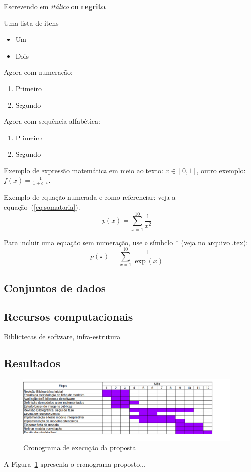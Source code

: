 \documentclass[12pt]{article}
\begin{document}
Escrevendo em \emph{itálico} ou \textbf{negrito}.

Uma lista de itens
\begin{itemize}
 \item Um
 \item Dois
\end{itemize}

Agora com numeração:
\begin{enumerate}
    \item Primeiro
    \item Segundo
\end{enumerate}

Agora com sequência alfabética:
\begin{enumerate}[label=(\alph*)]
    \item Primeiro
    \item Segundo
\end{enumerate}

Exemplo de expressão matemática em meio ao texto: $x \in [0, 1]$, outro exemplo: $f(x) = \frac{1}{1+e^{-x}}$.

Exemplo de equação numerada e como referenciar: veja a equação~(\ref{eq:somatoria}).
\begin{equation}
    \label{eq:somatoria}
    p(x) = \sum_{x=1}^{10} \frac{1}{x^2}
\end{equation}

Para incluir uma equação sem numeração, use o símbolo * (veja no arquivo .tex):
\begin{equation*}
    \label{eq:somatoria2}
    p(x) = \sum_{x=1}^{10} \frac{1}{\exp({x})}
\end{equation*}



\subsection{Conjuntos de dados}
\label{sec:dados}


\subsection{Recursos computacionais}
\label{sec:recursos}

Bibliotecas de software, infra-estrutura


\subsection{Resultados} 
\label{sec:resultados}


\begin{figure}[htb]
 \centering
 \includegraphics[width=1.0\textwidth]{images/crono2022}
 \caption{Cronograma de execução da proposta}
 \label{fig:crono}
\end{figure}


A Figura~\ref{fig:crono} apresenta o cronograma proposto...


\end{document}
